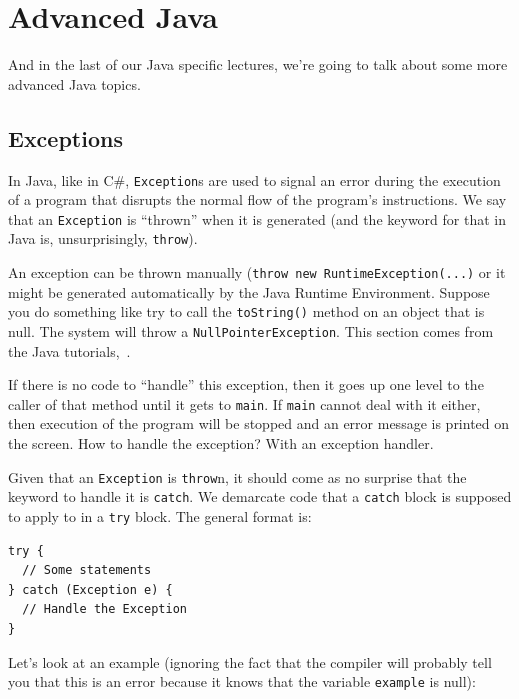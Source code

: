 




\section*{Advanced Java}

And in the last of our Java specific lectures, we're going to talk about some more advanced Java topics.

\subsection*{Exceptions}
In Java, like in C\#, \texttt{Exception}s are used to signal an error during the execution of a program that disrupts the normal flow of the program's instructions. We say that an \texttt{Exception} is ``thrown'' when it is generated (and the keyword for that in Java is, unsurprisingly, \texttt{throw}). 

An exception can be thrown manually (\texttt{throw new RuntimeException(...)} or it might be generated automatically by the Java Runtime Environment. Suppose you do something like try to call the \texttt{toString()} method on an object that is null. The system will throw a \texttt{NullPointerException}. This section comes from the Java tutorials,~\cite{oracle:exceptions}.

If there is no code to ``handle'' this exception, then it goes up one level to the caller of that method until it gets to \texttt{main}. If \texttt{main} cannot deal with it either, then execution of the program will be stopped and an error message is printed on the screen. How to handle the exception? With an exception handler. 

Given that an \texttt{Exception} is \texttt{throw}n, it should come as no surprise that the keyword to handle it is \texttt{catch}. We demarcate code that a \texttt{catch} block is supposed to apply to in a \texttt{try} block. The general format is:

\begin{verbatim}
try {
  // Some statements   
} catch (Exception e) {
  // Handle the Exception
}
\end{verbatim}

Let's look at an example (ignoring the fact that the compiler will probably tell you that this is an error because it knows that the variable \texttt{example} is null):

